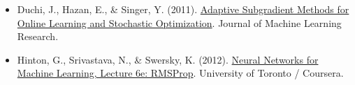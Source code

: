 \vspace{0.25em}
\begin{itemize}
\tightlist
\item
  Duchi, J., Hazan, E., \& Singer, Y. (2011). \href{https://jmlr.org/papers/v12/duchi11a.html}{Adaptive Subgradient Methods for Online Learning and Stochastic Optimization}. Journal of Machine Learning Research.
\item
  Hinton, G., Srivastava, N., \& Swersky, K. (2012). \href{https://www.cs.toronto.edu/~tijmen/csc321/slides/lecture_slides_lec6.pdf}{Neural Networks for Machine Learning, Lecture 6e: RMSProp}. University of Toronto / Coursera.
\end{itemize}

\clearpage
